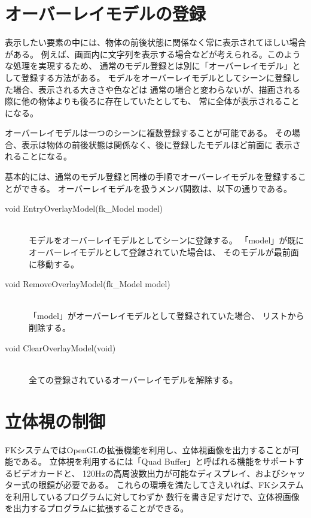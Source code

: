 \section{オーバーレイモデルの登録}

表示したい要素の中には、物体の前後状態に関係なく常に表示されてほしい場合がある。
例えば、画面内に文字列を表示する場合などが考えられる。このような処理を実現するため、
通常のモデル登録とは別に「オーバーレイモデル」として登録する方法がある。
モデルをオーバーレイモデルとしてシーンに登録した場合、表示される大きさや色などは
通常の場合と変わらないが、描画される際に他の物体よりも後ろに存在していたとしても、
常に全体が表示されることになる。

オーバーレイモデルは一つのシーンに複数登録することが可能である。
その場合、表示は物体の前後状態は関係なく、後に登録したモデルほど前面に
表示されることになる。

基本的には、通常のモデル登録と同様の手順でオーバーレイモデルを登録することができる。
オーバーレイモデルを扱うメンバ関数は、以下の通りである。
\begin{description}

\item[void EntryOverlayModel(fk\_Model model)] ~ \\
	モデルをオーバーレイモデルとしてシーンに登録する。
	「model」が既にオーバーレイモデルとして登録されていた場合は、
	そのモデルが最前面に移動する。\\

\item[void RemoveOverlayModel(fk\_Model model)] ~ \\
	「model」がオーバーレイモデルとして登録されていた場合、
	リストから削除する。\\

\item[void ClearOverlayModel(void)] ~ \\
	全ての登録されているオーバーレイモデルを解除する。

\end{description}

\section{立体視の制御}

FKシステムではOpenGLの拡張機能を利用し、立体視画像を出力することが可能である。
立体視を利用するには「Quad Buffer」と呼ばれる機能をサポートするビデオカードと、
120Hzの高周波数出力が可能なディスプレイ、およびシャッター式の眼鏡が必要である。
これらの環境を満たしてさえいれば、FKシステムを利用しているプログラムに対してわずか
数行を書き足すだけで、立体視画像を出力するプログラムに拡張することができる。

